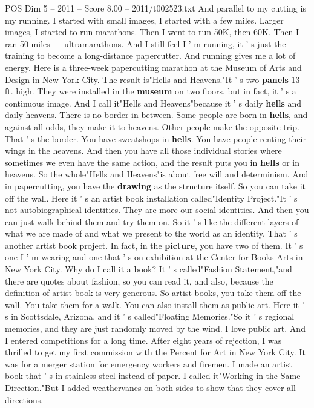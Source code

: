 \begin{textsample}{POS Dim 5 – 2011 – Score 8.00 – 2011/t002523.txt}
And parallel to my cutting is my running.
I started with small images, I started with a few miles.
Larger images, I started to run marathons.
Then I went to run 50K, then 60K.
Then I ran 50 miles — ultramarathons.
And I still feel I ' m running, it ' s just the training to become a long-distance papercutter.
And running gives me a lot of energy.
Here is a three-week papercutting marathon at the Museum of Arts and Design in New York City.
The result is"Hells and Heavens."It ' s two \textbf{panels} 13 ft. high.
They were installed in the \textbf{museum} on two floors, but in fact, it ' s a continuous image.
And I call it"Hells and Heavens"because it ' s daily \textbf{hells} and daily heavens.
There is no border in between.
Some people are born in \textbf{hells}, and against all odds, they make it to heavens.
Other people make the opposite trip.
That ' s the border.
You have sweatshops in \textbf{hells}.
You have people renting their wings in the heavens.
And then you have all those individual stories where sometimes we even have the same action, and the result puts you in \textbf{hells} or in heavens.
So the whole"Hells and Heavens"is about free will and determinism.
And in papercutting, you have the \textbf{drawing} as the structure itself.
So you can take it off the wall.
Here it ' s an artist book installation called"Identity Project."It ' s not autobiographical identities.
They are more our social identities.
And then you can just walk behind them and try them on.
So it ' s like the different layers of what we are made of and what we present to the world as an identity.
That ' s another artist book project.
In fact, in the \textbf{picture}, you have two of them.
It ' s one I ' m wearing and one that ' s on exhibition at the Center for Books Arts in New York City.
Why do I call it a book?
It ' s called"Fashion Statement,"and there are quotes about fashion, so you can read it, and also, because the definition of artist book is very generous.
So artist books, you take them off the wall.
You take them for a walk.
You can also install them as public art.
Here it ' s in Scottsdale, Arizona, and it ' s called"Floating Memories."So it ' s regional memories, and they are just randomly moved by the wind.
I love public art.
And I entered competitions for a long time.
After eight years of rejection, I was thrilled to get my first commission with the Percent for Art in New York City.
It was for a merger station for emergency workers and firemen.
I made an artist book that ' s in stainless steel instead of paper.
I called it"Working in the Same Direction."But I added weathervanes on both sides to show that they cover all directions.

\end{textsample}
